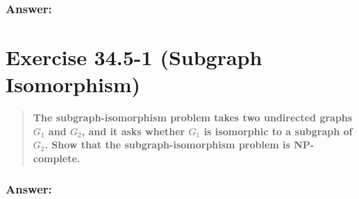\documentclass[titlepage]{article}\usepackage[]{graphicx}\usepackage[]{color}
\begin{document}
  \subsubsection{Answer:}









\section{Exercise 34.5-1 (Subgraph Isomorphism)}
  \begin{quote}
    \textbf{The subgraph-isomorphism problem takes two undirected graphs $G_1$ and
    $G_2$, and it asks whether $G_1$ is isomorphic to a subgraph of $G_2$. Show that the
    subgraph-isomorphism problem is NP-complete.}
  \end{quote}

  \subsubsection{Answer:}
\end{document}
